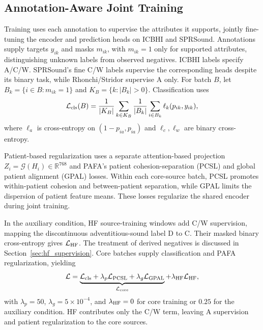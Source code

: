 \subsection{Annotation-Aware Joint Training}
\label{sec:joint_supervision}
\label{sec:hf_method}
Training uses each annotation to supervise the attributes it supports,
jointly fine-tuning the encoder and prediction heads on ICBHI and SPRSound.
Annotations supply targets $y_{ik}$ and masks $m_{ik}$,
with $m_{ik}=1$ only for supported attributes, distinguishing unknown
labels from observed negatives\cite{shi2021marginal,zhou2022unknown}.
ICBHI labels specify A/C/W. SPRSound's fine C/W labels supervise the
corresponding heads despite its binary task, while Rhonchi/Stridor
supervise A only. For batch $B$, let $B_k=\{i\in B:m_{ik}=1\}$ and
$K_B=\{k:|B_k|>0\}$. Classification uses
\begin{equation}
\mathcal L_{\rm cls}(B)=\frac{1}{|K_B|}\sum_{k\in K_B}
\frac{1}{|B_k|}\sum_{i\in B_k}\ell_k(p_{ik},y_{ik}),
\label{eq:classification_loss}
\end{equation}
where $\ell_a$ is cross-entropy on $(1-p_{ia},p_{ia})$ and
$\ell_c,\ell_w$ are binary cross-entropy.

Patient-based regularization uses a separate attention-based projection
$Z_i=\mathcal G(H_i)\in\mathbb{R}^{768}$ and PAFA's patient
cohesion-separation (PCSL) and global patient alignment (GPAL)
losses\cite{jeong2025pafa}. Within each core-source batch, PCSL promotes
within-patient cohesion and between-patient separation, while GPAL
limits the dispersion of patient feature means. These losses regularize
the shared encoder during joint training.

In the auxiliary condition, HF source-training windows add C/W supervision,
mapping the discontinuous adventitious-sound label D to C.
Their masked binary cross-entropy gives $\mathcal L_{\rm HF}$.
The treatment of derived negatives is discussed in Section~\ref{sec:hf_supervision}.
Core batches supply classification and PAFA regularization, yielding
\begin{equation}
\mathcal L=
\underbrace{\mathcal L_{\rm cls}
 +\lambda_p\mathcal L_{\rm PCSL}
 +\lambda_g\mathcal L_{\rm GPAL}}_{\mathcal L_{\rm core}}
 +\lambda_{\rm HF}\mathcal L_{\rm HF},
\label{eq:total_objective}
\end{equation}
with $\lambda_p=50$, $\lambda_g=5\times10^{-4}$, and
$\lambda_{\rm HF}=0$ for core training or $0.25$ for the auxiliary condition.
HF contributes only the C/W term, leaving A supervision and patient
regularization to the core sources.
